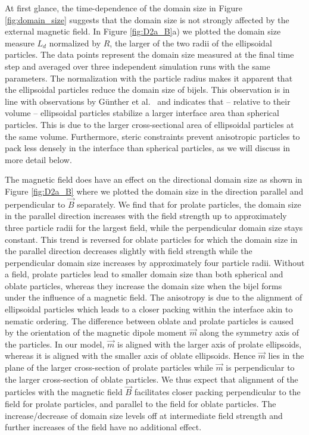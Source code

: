 At first glance, the time-dependence of the domain size in Figure 
\ref{fig:domain_size} suggests that the domain size is not strongly
affected by the external magnetic field. In Figure \ref{fig:D2a_B}a) we
plotted the domain size measure \(L_d\) normalized by \(R\), the larger
of the two radii of the ellipsoidal particles. The data points represent
the domain size measured at the final time step and averaged over three
independent simulation runs with the same parameters. The normalization
with the particle radius makes it apparent that the ellipsoidal
particles reduce the domain size of bijels. This observation is in line
with observations by Günther et al.~\cite{gunther_timescales_2014} and
indicates that -- relative to their volume -- ellipsoidal particles
stabilize a larger interface area than spherical particles. This is due
to the larger cross-sectional area of ellipsoidal particles at the same
volume. Furthermore, steric constraints prevent anisotropic particles to
pack less densely in the interface than spherical particles, as we will
discuss in more detail below.

The magnetic field does have an effect on the directional
domain size as shown in Figure \ref{fig:D2a_B} where we plotted the
domain size in the direction parallel and perpendicular to \(\vec{B}\)
separately. We find that for prolate particles, the domain size in the
parallel direction increases with the field strength up to approximately
three particle radii for the largest field, while the perpendicular
domain size stays constant. This trend is reversed for oblate particles
for which the domain size in the parallel direction decreases slightly
with field strength while the perpendicular domain size increases by
approximately four particle radii. Without a field, prolate
particles lead to smaller domain size than both spherical and oblate
particles, whereas they increase the domain size when the bijel forms under the
influence of a magnetic field. The anisotropy is due to the alignment of
ellipsoidal particles which leads to a closer packing within the
interface akin to nematic ordering. The difference between oblate and
prolate particles is caused by the orientation of the magnetic dipole
moment \(\vec{m}\) along the symmetry axis of the particles. In our
model, \(\vec{m}\) is aligned with the larger axis of prolate
ellipsoids, whereas it is aligned with the smaller axis of oblate
ellipsoids. Hence \(\vec{m}\) lies in the plane of the larger
cross-section of prolate particles while \(\vec{m}\) is perpendicular to
the larger cross-section of oblate particles. We thus expect that
alignment of the particles with the magnetic field \(\vec{B}\)
facilitates closer packing perpendicular to the field for prolate
particles, and parallel to the field for oblate particles. The
increase/decrease of domain size levels off at intermediate field
strength and further increases of the field have no additional effect.

